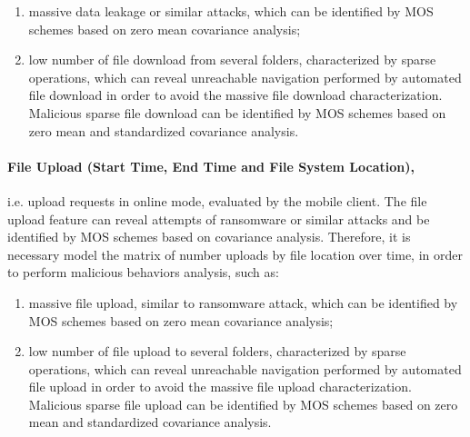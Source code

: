 \documentclass[twocolumn]{svjour3}          	%
\begin{document}
\begin{enumerate}
	\item massive data leakage or similar attacks, which can be identified by MOS schemes based on zero mean covariance analysis;
	\item low number of file download from several folders, characterized by sparse operations, which can reveal unreachable navigation performed by automated file download in order to avoid the massive file download characterization. Malicious sparse file download can be identified by MOS schemes based on zero mean and standardized covariance analysis.
\end{enumerate}

\paragraph{\textbf{File Upload (Start Time, End Time and File System Location)},}i.e. upload requests in online mode, evaluated by the mobile client. The file upload feature can reveal attempts of ransomware or similar attacks and be identified by MOS schemes based on covariance analysis. Therefore, it is necessary model the matrix of number uploads by file location over time, in order to perform malicious behaviors analysis, such as:

\begin{enumerate}
	\item massive file upload, similar to ransomware attack, which can be identified by MOS schemes based on zero mean covariance analysis; 
	\item low number of file upload to several folders, characterized by sparse operations, which can reveal unreachable navigation performed by automated file upload in order to avoid the massive file upload characterization. Malicious sparse file upload can be identified by MOS schemes based on zero mean and standardized covariance analysis.
\end{enumerate}
\end{document}

